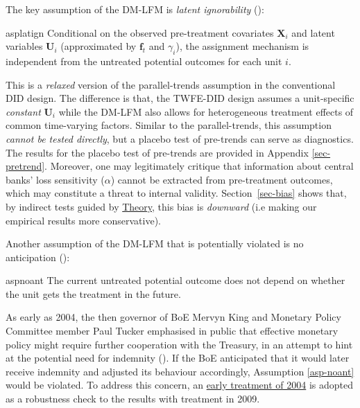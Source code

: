 \documentclass[
  a4paper,
  abstract=true]{scrartcl}
\theoremstyle{definition}
\begin{document}
The key assumption of the DM-LFM is \emph{latent ignorability}
():

\begin{restatable}{asp}{latign}
\label{asp-latign}
Conditional on the observed pre-treatment covariates $\mathbf{X}_{i}$ and latent variables $\mathbf{U}_i$ (approximated by $\mathbf{f}_t$ and $\gamma_i$), the assignment mechanism is independent from the untreated potential outcomes for each unit $i$.
\end{restatable}

This is a \emph{relaxed} version of the parallel-trends assumption in
the conventional DID design. The difference is that, the TWFE-DID design
assumes a unit-specific \emph{constant} \(\mathbf{U}_i\) while the
DM-LFM also allows for heterogeneous treatment effects of common
time-varying factors. Similar to the parallel-trends, this assumption
\emph{cannot be tested directly}, but a placebo test of pre-trends can
serve as diagnostics. The results for the placebo test of pre-trends are
provided in Appendix \ref{sec-pretrend}. Moreover, one may legitimately
critique that information about central banks' loss sensitivity
(\(\alpha\)) cannot be extracted from pre-treatment outcomes, which may
constitute a threat to internal validity. Section~\ref{sec-bias} shows
that, by indirect tests guided by \hyperref[sec-theory]{Theory}, this
bias is \emph{downward} (i.e making our empirical results more
conservative).

Another assumption of the DM-LFM that is potentially violated is no
anticipation ():

\begin{restatable}[No anticipation]{asp}{noant}
\label{asp-noant}
The current untreated potential outcome does not depend on whether the unit gets the treatment in the future.
\end{restatable}

As early as 2004, the then governor of BoE Mervyn King and Monetary
Policy Committee member Paul Tucker emphasised in public that effective
monetary policy might require further cooperation with the Treasury, in
an attempt to hint at the potential need for indemnity
(). If the BoE anticipated
that it would later receive indemnity and adjusted its behaviour
accordingly, Assumption \ref{asp-noant} would be violated. To address
this concern, an \hyperref[sec-main-early]{early treatment of 2004} is
adopted as a robustness check to the results with treatment in 2009.
\end{document}

